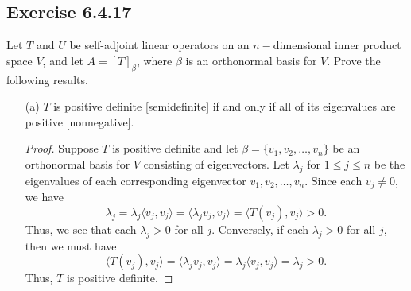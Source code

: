 \subsection*{Exercise 6.4.17} Let \( T  \) and \( U  \) be self-adjoint linear operators on an \( n- \)dimensional inner product space \( V  \), and let \( A = [T]_{\beta} \), where \( \beta  \) is an orthonormal basis for \( V  \). Prove the following results.

\begin{enumerate}
    \item[(a)] \( T  \) is positive definite [semidefinite] if and only if all of its eigenvalues are positive [nonnegative].
        \begin{proof}
        Suppose \( T  \) is positive definite and let \( \beta = \{ {v}_{1}, {v}_{2}, \dots, {v}_{n} \}  \) be an orthonormal basis for \( V  \) consisting of eigenvectors. Let \( \lambda_j \) for \( 1 \leq j \leq n  \) be the eigenvalues of each corresponding eigenvector \( {v}_{1}, {v}_{2}, \dots, {v}_{n}  \). Since each \( {v}_{j} \neq 0  \), we have
        \[  {\lambda}_{j} = {\lambda}_{j} \langle {v}_{j} , {v}_{j}  \rangle = \langle {\lambda}_{j} {v}_{j} , {v}_{j} \rangle = \langle T({v}_{j}) , {v}_{j} \rangle > 0. \]
        Thus, we see that each \( \lambda_j > 0  \) for all \( j  \). Conversely, if each \( {\lambda}_{j} > 0  \) for all \( j  \), then we must have
        \[  \langle T({v}_{j}) , {v}_{j} \rangle = \langle {\lambda}_{j} {v}_{j} , {v}_{j} \rangle = {\lambda}_{j} \langle {v}_{j} , {v}_{j} \rangle = \lambda_j > 0. \]
        Thus, \( T  \) is positive definite.


\end{proof}
\end{enumerate}
